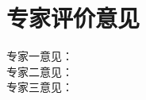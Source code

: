 \documentclass[10.5pt]{article} %
\begin{document}
\section*{专家评价意见}
\setlength{\parindent}{0pt}

专家一意见：\\[1.2cm]
专家二意见：\\[1.2cm]
专家三意见：\\[1.2cm]
\newpage
\thispagestyle{empty}





\end{document}
